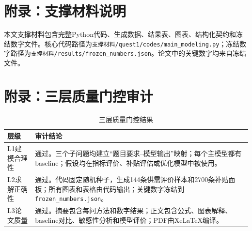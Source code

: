 \documentclass[12pt,a4paper]{ctexart}
\begin{document}
\appendix
\section{附录：支撑材料说明}
本文支撑材料包含完整Python代码、生成数据、结果表、图表、结构化契约和冻结数字文件。核心代码路径为\texttt{支撑材料/quest1/codes/main\_modeling.py}；冻结数字路径为\texttt{支撑材料/results/frozen\_numbers.json}。论文中的关键数字均来自冻结文件。

\section{附录：三层质量门控审计}
\begin{longtable}{p{}p{}}
\caption{三层质量门控结果}\\
\toprule
层级 & 审计结论\\
\midrule
L1建模合理性 & 通过。三个子问题均建立“题目要求--模型输出”映射；每个主模型都有baseline；假设均在指标评价、补贴评估或优化模型中被使用。\\
L2求解正确性 & 通过。代码固定随机种子，生成144条供需评价样本和2700条补贴面板；所有图表和表格由代码输出；关键数字冻结到\texttt{frozen\_numbers.json}。\\
L3论文质量 & 通过。摘要包含每问方法和数字结果；正文包含公式、图表解释、baseline对比、敏感性分析和模型评价；PDF由XeLaTeX编译。\\
\bottomrule
\end{longtable}
\end{document}
